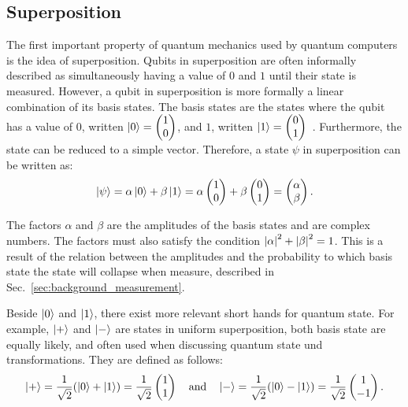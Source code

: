 \subsection{Superposition}
\label{sec:background_superposition}
The first important property of quantum mechanics used by quantum computers is the idea of superposition. Qubits in superposition are often informally described as simultaneously having a value of $0$ and $1$ until their state is measured. However, a qubit in superposition is more formally a linear combination of its basis states. The basis states are the states where the qubit has a value of $0$, written $\ket{0} = \begin{pmatrix} 1 \\ 0 \end{pmatrix}$, and $1$, written $\ket{1} = \begin{pmatrix} 0 \\ 1 \end{pmatrix}$~\cite{DiCh20a}.
Furthermore, the state can be reduced to a simple vector. Therefore, a state $\psi$ in superposition can be written as:
\begin{equation*}
    \ket{\psi} = \alpha \ket{0} + \beta \ket{1} = \alpha \begin{pmatrix} 1 \\ 0 \end{pmatrix} + \beta \begin{pmatrix} 0 \\ 1 \end{pmatrix} = \begin{pmatrix} \alpha \\ \beta \end{pmatrix}.
\end{equation*}

The factors $\alpha$ and $\beta$ are the amplitudes of the basis states and are complex numbers. The factors must also satisfy the condition $\abs{\alpha}^2 + \abs{\beta}^2 = 1$. This is a result of the relation between the amplitudes and the probability to which basis state the state will collapse when measure, described in Sec.~\ref{sec:background_measurement}.

Beside $\ket{0}$ and $\ket{1}$, there exist more relevant short hands for quantum state. For example, $\ket{+}$ and $\ket{-}$ are states in uniform superposition, \ie both basis state are equally likely, and often used when discussing quantum state und transformations. They are defined as follows:
\begin{equation*}
    \ket{+} = \frac{1}{\sqrt{2}} (\ket{0} + \ket{1}) = \frac{1}{\sqrt{2}} \begin{pmatrix} 1 \\ 1 \end{pmatrix}
    \quad  \text{and}  \quad
     \ket{-} = \frac{1}{\sqrt{2}} (\ket{0} - \ket{1})  = \frac{1}{\sqrt{2}} \begin{pmatrix} 1 \\ -1 \end{pmatrix}.
\end{equation*}

